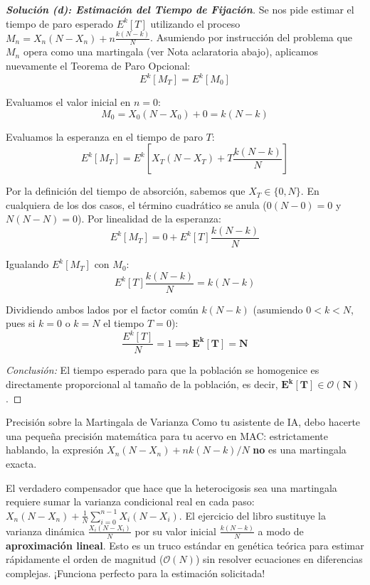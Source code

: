 \documentclass[10pt,a4paper]{article}
\begin{document}
\vspace{5mm}

\begin{proof}[\textbf{Solución (d): Estimación del Tiempo de Fijación}]
    Se nos pide estimar el tiempo de paro esperado $E^k[T]$ utilizando el proceso $M_n = X_n(N-X_n) + n \frac{k(N-k)}{N}$. 
    Asumiendo por instrucción del problema que $M_n$ opera como una martingala (ver Nota aclaratoria abajo), aplicamos nuevamente el Teorema de Paro Opcional:
    \[ E^k[M_T] = E^k[M_0] \]
    
    Evaluamos el valor inicial en $n=0$:
    \[ M_0 = X_0(N-X_0) + 0 = k(N-k) \]
    
    Evaluamos la esperanza en el tiempo de paro $T$:
    \[ E^k[M_T] = E^k \left[ X_T(N-X_T) + T \frac{k(N-k)}{N} \right] \]
    
    Por la definición del tiempo de absorción, sabemos que $X_T \in \{0, N\}$. En cualquiera de los dos casos, el término cuadrático se anula ($0(N-0) = 0$ y $N(N-N) = 0$). Por linealidad de la esperanza:
    \[ E^k[M_T] = 0 + E^k[T] \frac{k(N-k)}{N} \]
    
    Igualando $E^k[M_T]$ con $M_0$:
    \[ E^k[T] \frac{k(N-k)}{N} = k(N-k) \]
    
    Dividiendo ambos lados por el factor común $k(N-k)$ (asumiendo $0 < k < N$, pues si $k=0$ o $k=N$ el tiempo $T=0$):
    \[ \frac{E^k[T]}{N} = 1 \implies \mathbf{E^k[T] = N} \]
    
    \textit{Conclusión:} El tiempo esperado para que la población se homogenice es directamente proporcional al tamaño de la población, es decir, $\mathbf{E^k[T] \in \mathcal{O}(N)}$.
\end{proof}

\vspace{2mm}

\begin{nota}{Precisión sobre la Martingala de Varianza}
    Como tu asistente de IA, debo hacerte una pequeña precisión matemática para tu acervo en MAC: estrictamente hablando, la expresión $X_n(N-X_n) + n k(N-k)/N$ \textbf{no} es una martingala exacta. 
    
    El verdadero compensador que hace que la heterocigosis sea una martingala requiere sumar la varianza condicional real en cada paso: $X_n(N-X_n) + \frac{1}{N}\sum_{i=0}^{n-1} X_i(N-X_i)$. El ejercicio del libro sustituye la varianza dinámica $\frac{X_i(N-X_i)}{N}$ por su valor inicial $\frac{k(N-k)}{N}$ a modo de \textbf{aproximación lineal}. Esto es un truco estándar en genética teórica para estimar rápidamente el orden de magnitud ($\mathcal{O}(N)$) sin resolver ecuaciones en diferencias complejas. ¡Funciona perfecto para la estimación solicitada!
\end{nota}
\end{document}
